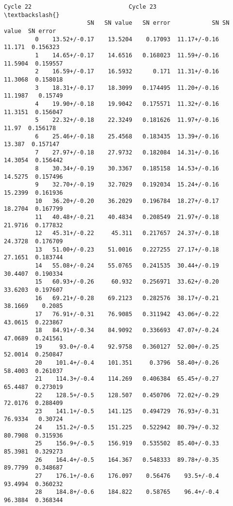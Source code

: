 \documentclass[11pt]{article}
\begin{document}
\begin{Verbatim}[commandchars=\\\{\}]
                  Cycle 22                            Cycle 23                     \textbackslash{}
                        SN   SN value   SN error            SN SN value  SN error   
         0    13.52+/-0.17    13.5204    0.17093  11.17+/-0.16   11.171  0.156323   
         1    14.65+/-0.17    14.6516   0.168023  11.59+/-0.16  11.5904  0.159557   
         2    16.59+/-0.17    16.5932      0.171  11.31+/-0.16  11.3068  0.158018   
         3    18.31+/-0.17    18.3099   0.174495  11.20+/-0.16  11.1987   0.15749   
         4    19.90+/-0.18    19.9042   0.175571  11.32+/-0.16  11.3151  0.156047   
         5    22.32+/-0.18    22.3249   0.181626  11.97+/-0.16    11.97  0.156178   
         6    25.46+/-0.18    25.4568   0.183435  13.39+/-0.16   13.387  0.157147   
         7    27.97+/-0.18    27.9732   0.182084  14.31+/-0.16  14.3054  0.156442   
         8    30.34+/-0.19    30.3367   0.185158  14.53+/-0.16  14.5275  0.157496   
         9    32.70+/-0.19    32.7029   0.192034  15.24+/-0.16  15.2399  0.161936   
         10   36.20+/-0.20    36.2029   0.196784  18.27+/-0.17  18.2704  0.167799   
         11   40.48+/-0.21    40.4834   0.208549  21.97+/-0.18  21.9716  0.177832   
         12   45.31+/-0.22     45.311   0.217657  24.37+/-0.18  24.3728  0.176709   
         13   51.00+/-0.23    51.0016   0.227255  27.17+/-0.18  27.1651  0.183744   
         14   55.08+/-0.24    55.0765   0.241535  30.44+/-0.19  30.4407  0.190334   
         15   60.93+/-0.26     60.932   0.256971  33.62+/-0.20  33.6203  0.197607   
         16   69.21+/-0.28    69.2123   0.282576  38.17+/-0.21  38.1669    0.2085   
         17   76.91+/-0.31    76.9085   0.311942  43.06+/-0.22  43.0615  0.223867   
         18   84.91+/-0.34    84.9092   0.336693  47.07+/-0.24  47.0689  0.241561   
         19     93.0+/-0.4    92.9758   0.360127  52.00+/-0.25  52.0014  0.250847   
         20    101.4+/-0.4    101.351     0.3796  58.40+/-0.26  58.4003  0.261037   
         21    114.3+/-0.4    114.269   0.406384  65.45+/-0.27  65.4487  0.273019   
         22    128.5+/-0.5    128.507   0.450706  72.02+/-0.29  72.0176  0.288409   
         23    141.1+/-0.5    141.125   0.494729  76.93+/-0.31  76.9334   0.30724   
         24    151.2+/-0.5    151.225   0.522942  80.79+/-0.32  80.7908  0.315936   
         25    156.9+/-0.5    156.919   0.535502  85.40+/-0.33  85.3981  0.329273   
         26    164.4+/-0.5    164.367   0.548333  89.78+/-0.35  89.7799  0.348687   
         27    176.1+/-0.6    176.097    0.56476    93.5+/-0.4  93.4994  0.360232   
         28    184.8+/-0.6    184.822    0.58765    96.4+/-0.4  96.3884  0.368344   

\end{Verbatim}
\end{document}
